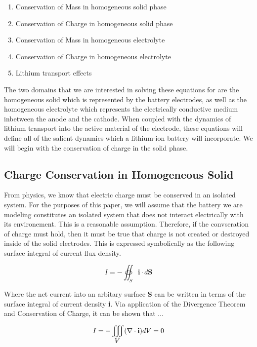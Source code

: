 \documentclass[lettersize,journal]{IEEEtran}
\newcommand{\volume}{{\ooalign{\hfil$V$\hfil\cr\kern0.08em--\hfil\cr}}}
\begin{document}
 \begin{enumerate}
   \item Conservation of Mass in homogeneous solid phase
   \item Conservation of Charge in homogeneous solid phase
   \item Conservation of Mass in homogeneous electrolyte
   \item Conservation of Charge in homogeneous electrolyte
   \item Lithium transport effects \\
  \end{enumerate}

The two  domains that we are interested in solving these equations for are the homogeneous solid which is represented by the battery electrodes, as well as the homogeneous electrolyte which represents the electrically conductive medium inbetween the anode and the cathode. When coupled with the dynamics of lithium transport into the active material of the electrode, these equations will define all of the salient dynamics which a lithium-ion battery will incorporate. We will begin with the conservation of charge in the solid phase.

\subsection{Charge Conservation in Homogeneous Solid}

From physics, we know that electric charge must be conserved in an isolated system. For the purposes of this paper, we will assume that the battery we are modeling constitutes an isolated system that does not interact electrically with its environement. This is a reasonable assumption. Therefore, if the convseration of charge must hold, then it must be true that charge is not created or destroyed inside of the solid electrodes. This is expressed symbolically as the following surface integral of current flux density.

\begin{equation}
 I = - \oiint_S \textbf{i} \cdot d \textbf{S}
\end{equation}

\noindent Where the net current into an arbitary surface \textbf{S} can be written in terms of the surface integral of current density \textbf{i}. Via application of the Divergence Theorem and Conservation of Charge, it can be shown that ...

\begin{equation}
    I = - \iiint_{\volume} (\nabla \cdot \textbf{i})d{\volume} = 0
\end{equation}
\end{document}
